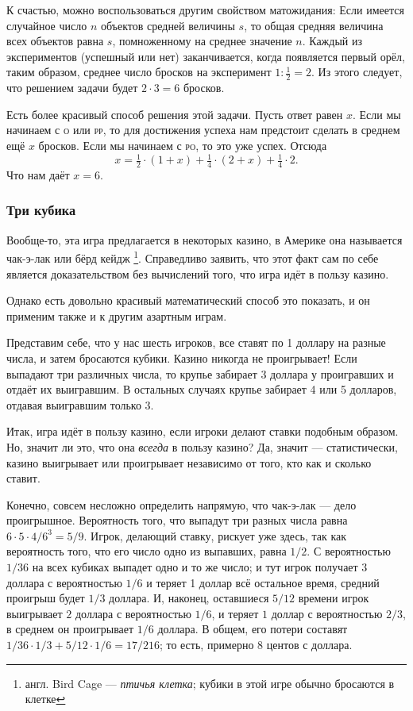 К счастью, можно воспользоваться другим свойством матожидания:
Если имеется случайное число $n$ объектов средней величины $s$, то общая средняя величина всех объектов равна $s$, помноженному на среднее значение $n$.
Каждый из экспериментов (успешный или нет) заканчивается, когда появляется первый орёл, таким образом, среднее число бросков на эксперимент $1:\tfrac12=2$.
Из этого следует, что
решением задачи будет $2{\cdot}3=6$ бросков.\heart

Есть более красивый способ решения этой задачи.
Пусть ответ равен $x$.
Если мы начинаем с \textsc{о} или \textsc{рр}, то для достижения успеха нам предстоит сделать в среднем ещё $x$ бросков.
Если мы начинаем с \textsc{ро}, то это уже успех.
Отсюда
\[x=\tfrac12 \cdot(1+x)+\tfrac14 \cdot(2+x)+\tfrac14 \cdot2.\]
Что нам даёт $x=6$.

\subsubsection*{Три кубика}%

Вообще-то, эта игра предлагается в некоторых казино, в Америке она называется чак-э-лак или бёрд кейдж%
\footnote{англ. Bird Cage --- \emph{птичья клетка}; кубики в этой игре обычно бросаются в клетке}. 
Справедливо заявить, что этот факт сам по себе является доказательством без вычислений того, что игра идёт в пользу казино.

Однако есть довольно красивый математический способ это показать, и он применим также и к другим азартным играм.

\medskip

Представим себе, что у нас шесть игроков, все ставят по 1 доллару на разные числа, и затем бросаются кубики.
Казино никогда не проигрывает!
Если выпадают три различных числа, то крупье забирает 3 доллара у проигравших и отдаёт их выигравшим.
В остальных случаях крупье забирает 4 или 5 долларов, отдавая выигравшим только 3.
\heart

Итак, игра идёт в пользу казино, если игроки делают ставки подобным образом.
Но, значит ли это, что она \emph{всегда} в пользу казино?
Да, значит --- статистически, казино выигрывает или проигрывает независимо от того, кто как и сколько ставит.

Конечно, совсем несложно определить напрямую, что чак-э-лак --- дело проигрышное.
Вероятность того, что выпадут три разных числа равна $6{\cdot}5{\cdot}4/6^3=5/9$.
Игрок, делающий ставку, рискует уже здесь, так как вероятность того, что его число одно из выпавших, равна $1/2$.
С вероятностью $1/36$ на всех кубиках выпадет одно и то же число;
и тут игрок получает $3$ доллара с вероятностью $1/6$ и теряет 1 доллар всё остальное время, средний проигрыш будет $1/3$ доллара.
И, наконец, оставшиеся $5/12$ времени игрок выигрывает $2$ доллара с вероятностью $1/6$, и теряет $1$ доллар с вероятностью $2/3$, в среднем он проигрывает $1/6$ доллара.
В общем, его потери составят $1/36{\cdot}1/3 + 5/12{\cdot}1/6 = 17/216$; то есть, примерно $8$ центов с доллара.

